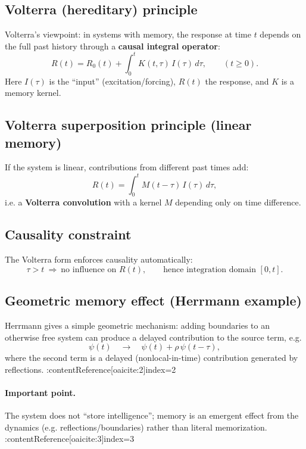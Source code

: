 \subsection{Volterra (hereditary) principle}
Volterra's viewpoint: in systems with memory, the response at time $t$ depends on
the full past history through a \textbf{causal integral operator}:
\begin{equation}
R(t)=R_0(t)+\int_0^t K(t,\tau)\,I(\tau)\,d\tau,
\qquad (t\ge 0).
\end{equation}
Here $I(\tau)$ is the ``input'' (excitation/forcing), $R(t)$ the response, and $K$ is a memory kernel.

\subsection{Volterra superposition principle (linear memory)}
If the system is linear, contributions from different past times add:
\begin{equation}
R(t) = \int_0^t M(t-\tau)\,I(\tau)\,d\tau,
\end{equation}
i.e. a \textbf{Volterra convolution} with a kernel $M$ depending only on time difference.

\subsection{Causality constraint}
The Volterra form enforces causality automatically:
\begin{equation}
\tau>t \ \Rightarrow\  \text{no influence on }R(t),
\qquad \text{hence integration domain }[0,t].
\end{equation}

\subsection{Geometric memory effect (Herrmann example)}
Herrmann gives a simple geometric mechanism: adding boundaries to an otherwise free system
can produce a delayed contribution to the source term, e.g.
\begin{equation}
\psi(t)\quad \longrightarrow\quad \psi(t)+\rho\,\psi(t-\tau),
\end{equation}
where the second term is a delayed (nonlocal-in-time) contribution generated by reflections. :contentReference[oaicite:2]{index=2}

\paragraph{Important point.}
The system does not ``store intelligence''; memory is an emergent effect from the dynamics
(e.g. reflections/boundaries) rather than literal memorization. :contentReference[oaicite:3]{index=3}

